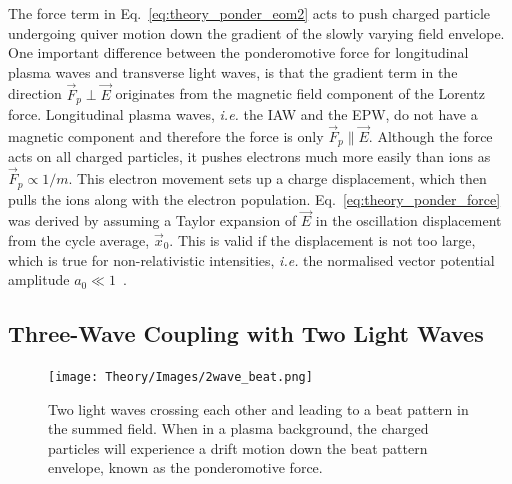 The force term in Eq.~\ref{eq:theory_ponder_eom2} acts to push charged particle undergoing quiver motion down the gradient of the slowly varying field envelope.
One important difference between the ponderomotive force for longitudinal plasma waves and transverse light waves, is that the gradient term in the direction $\vec{F}_p\perp\vec{E}$ originates from the magnetic field component of the Lorentz force.
Longitudinal plasma waves, \textit{i.e.} the \ac{IAW} and the \ac{EPW}, do not have a magnetic component and therefore the force is only $\vec{F}_p\parallel\vec{E}$.
Although the force acts on all charged particles, it pushes electrons much more easily than ions as $\vec{F}_p\propto 1/m$.
This electron movement sets up a charge displacement, which then pulls the ions along with the electron population.
Eq.~\ref{eq:theory_ponder_force} was derived by assuming a Taylor expansion of $\vec{E}$ in the oscillation displacement from the cycle average, $\vec{x}_0$.
This is valid if the displacement is not too large, which is true for non-relativistic intensities, \textit{i.e.} the normalised vector potential amplitude $a_0\ll 1$~\cite{michel_introduction_2023}.

\subsection{Three-Wave Coupling with Two Light Waves}%
\label{sec:theory_threewave}

\begin{figure}[t!]
    \texttt{[image: Theory/Images/2wave\_beat.png]}
    \centering
    \caption{Two light waves crossing each other and leading to a beat pattern in the summed field.
    When in a plasma background, the charged particles will experience a drift motion down the beat pattern envelope, known as the ponderomotive force.}%
    \label{fig:theory_twowavebeat}
\end{figure}

